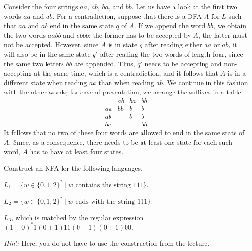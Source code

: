 \documentclass{exercise}
\begin{document}
\begin{solution}
  Consider the four strings $aa$, $ab$, $ba$, and $bb$.  Let us have a look at
  the first two words $aa$ and $ab$.  For a contradiction, suppose that there
  is a DFA $A$ for $L$ such that $aa$ and $ab$ end in the same state $q$ of $A$.
  If we append the word $bb$, we obtain the two words $aabb$ and $abbb$; the
  former has to be accepted by $A$, the latter must not be accepted.  However,
  since $A$ is in state $q$ after reading either $aa$ or $ab$, it will also
  be in the same state $q'$ after reading the two words of length four, since
  the same two letters $bb$ are appended.  Thus, $q'$ needs to be accepting and
  non-accepting at the same time, which is a contradiction, and it follows that
  $A$ is in a different state when reading $aa$ than when reading $ab$. 
  We continue in this fashion with the other words; for ease of presentation, we
  arrange the suffixes in a table
  \[ \begin{array}{r|ccc}
          & ab & ba & bb \\
       \hline
       aa & bb & b  & b  \\
       ab &    & b  & b  \\
       ba &    &    & bb
     \end{array} \]
  It follows that no two of these four words are allowed to end in the same
  state of $A$.  Since, as a consequence, there needs to be at least one state
  for each such word, $A$ has to have at least four states.
\end{solution}



\subtask Construct an NFA for the following languages. 

  \begin{taskitems}
    \item $L_1=\{w\in\{0,1,2\}^*\mid w \text{ contains the string } 111\}$,
    \item $L_2=\{w\in\{0,1,2\}^*\mid w \text{ ends with the string } 111\}$,
    \item $L_3$, which is matched by the regular expression $(1+0)^*1(0+1)11(0+1)(0+1)00$.

    \smallskip
    \textit{Hint:} Here, you do not have to use the construction from the lecture.
  \end{taskitems}
\end{document}
